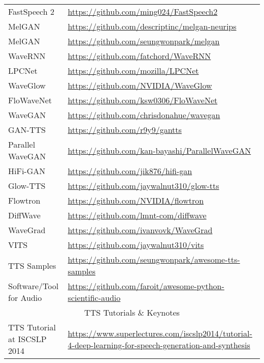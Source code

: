 \documentclass{article}
\begin{document}
\begin{center}
\begin{longtable}{l l l l l}
FastSpeech 2 & \multicolumn{4}{p{9.5cm}}{\url{https://github.com/ming024/FastSpeech2}} \\
MelGAN & \multicolumn{4}{p{9.5cm}}{\url{https://github.com/descriptinc/melgan-neurips}} \\
MelGAN & \multicolumn{4}{p{9.5cm}}{\url{https://github.com/seungwonpark/melgan}} \\
WaveRNN & \multicolumn{4}{p{9.5cm}}{\url{https://github.com/fatchord/WaveRNN}} \\
LPCNet & \multicolumn{4}{p{9.5cm}}{\url{https://github.com/mozilla/LPCNet}} \\
WaveGlow & \multicolumn{4}{p{9.5cm}}{\url{https://github.com/NVIDIA/WaveGlow}} \\
FloWaveNet & \multicolumn{4}{p{9.5cm}}{\url{https://github.com/ksw0306/FloWaveNet}} \\
WaveGAN & \multicolumn{4}{p{9.5cm}}{\url{https://github.com/chrisdonahue/wavegan}} \\
GAN-TTS & \multicolumn{4}{p{9.5cm}}{\url{https://github.com/r9y9/gantts}} \\
Parallel WaveGAN & \multicolumn{4}{p{9.5cm}}{\url{https://github.com/kan-bayashi/ParallelWaveGAN}} \\
HiFi-GAN & \multicolumn{4}{p{9.5cm}}{\url{https://github.com/jik876/hifi-gan}} \\
Glow-TTS & \multicolumn{4}{p{9.5cm}}{\url{https://github.com/jaywalnut310/glow-tts}} \\
Flowtron & \multicolumn{4}{p{9.5cm}}{\url{https://github.com/NVIDIA/flowtron}} \\
DiffWave & \multicolumn{4}{p{9.5cm}}{\url{https://github.com/lmnt-com/diffwave}} \\
WaveGrad & \multicolumn{4}{p{9.5cm}}{\url{https://github.com/ivanvovk/WaveGrad}} \\
VITS & \multicolumn{4}{p{9.5cm}}{\url{https://github.com/jaywalnut310/vits}} \\
TTS Samples & \multicolumn{4}{p{9.5cm}}{\url{https://github.com/seungwonpark/awesome-tts-samples}} \\
Software/Tool for Audio & \multicolumn{4}{p{8cm}}{\url{https://github.com/faroit/awesome-python-scientific-audio}} \\
\bottomrule
\toprule
\multicolumn{5}{c}{\small TTS Tutorials \& Keynotes} \\
\midrule
TTS Tutorial at ISCSLP 2014~\cite{qian2014tutorial}& \multicolumn{4}{p{9.5cm}}{\url{https://www.superlectures.com/iscslp2014/tutorial-4-deep-learning-for-speech-generation-and-synthesis}} \\

\end{longtable}
\end{center}
\end{document}
